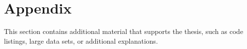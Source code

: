 \chapter{Appendix}
This section contains additional material that supports the thesis, such as code listings, large data sets, or additional explanations.